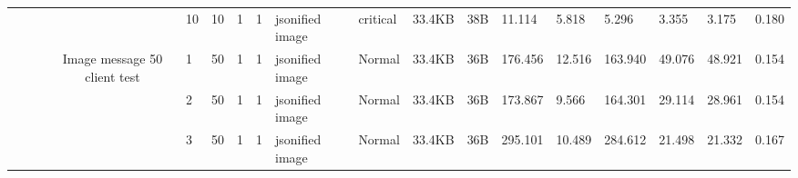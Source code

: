 \begin{landscape}
\begin{table}[]
{\begin{tabular}{@{}ccccllllllllllllll@{}}
                                                                                   &                              &                                &                                                                                                          & 10                                                    & 10                                       & 1                                          & 1                                 & jsonified image                  & critical                           & 33.4KB                                        & 38B                                             & 11.114                  & 5.818    & 5.296                        & 3.355                   & 3.175    & 0.180                        \\
                                                                                   &                              &                                & \multirow{50}{*}{Image message 50 client test}                                                           & 1                                                     & 50                                       & 1                                          & 1                                 & jsonified image                  & Normal                             & 33.4KB                                        & 36B                                             & 176.456                 & 12.516   & 163.940                      & 49.076                  & 48.921   & 0.154                        \\
                                                                                   &                              &                                &                                                                                                          & 2                                                     & 50                                       & 1                                          & 1                                 & jsonified image                  & Normal                             & 33.4KB                                        & 36B                                             & 173.867                 & 9.566    & 164.301                      & 29.114                  & 28.961   & 0.154                        \\
                                                                                   &                              &                                &                                                                                                          & 3                                                     & 50                                       & 1                                          & 1                                 & jsonified image                  & Normal                             & 33.4KB                                        & 36B                                             & 295.101                 & 10.489   & 284.612                      & 21.498                  & 21.332   & 0.167                        \\

\end{tabular}}
\end{table}
\end{landscape}
